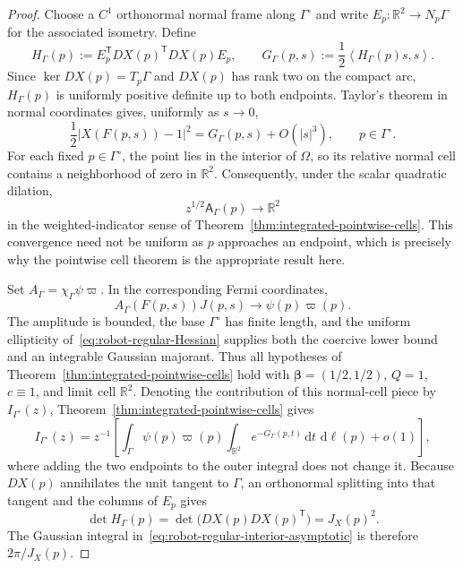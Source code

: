 \documentclass[10pt,a4paper]{amsart}
\newcommand{\Afib}{\mathsf{A}}
\newcommand{\R}{\mathbb{R}}
\newcommand{\dd}{\,\mathrm{d}}
\newcommand{\inner}[2]{\left\langle #1,#2\right\rangle}
\begin{document}
\begin{proof}
Choose a $C^1$ orthonormal normal frame along $\Gamma^\circ$ and write
$E_p:\R^2\to N_p\Gamma$ for the associated isometry.  Define
\begin{equation}\label{eq:robot-regular-Hessian}
 H_\Gamma(p):=E_p^{\mathsf T}DX(p)^{\mathsf T}DX(p)E_p,
 \qquad
 G_\Gamma(p,s):=\frac12\inner{H_\Gamma(p)s}{s}.
\end{equation}
Since $\ker DX(p)=T_p\Gamma$ and $DX(p)$ has rank two on the compact arc,
$H_\Gamma(p)$ is uniformly positive definite up to both endpoints.  Taylor's
theorem in normal coordinates gives, uniformly as $s\to0$,
\begin{equation}\label{eq:robot-regular-normal-model}
 \frac12|X(F(p,s))-1|^2
 =G_\Gamma(p,s)+O(|s|^3),
 \qquad p\in\Gamma^\circ.
\end{equation}
For each fixed $p\in\Gamma^\circ$, the point lies in the interior of $\Omega$,
so its relative normal cell contains a neighborhood of zero in $\R^2$.
Consequently, under the scalar quadratic dilation,
\[
 z^{1/2}\Afib_\Gamma(p)\longrightarrow\R^2
\]
in the weighted-indicator sense of
Theorem~\ref{thm:integrated-pointwise-cells}.  This convergence need not be
uniform as $p$ approaches an endpoint, which is precisely why the pointwise
cell theorem is the appropriate result here.

Set $A_\Gamma=\chi_\Gamma\psi\varpi$.  In the corresponding Fermi
coordinates,
\[
 A_\Gamma(F(p,s))J(p,s)\longrightarrow\psi(p)\varpi(p).
\]
The amplitude is bounded, the base $\Gamma^\circ$ has finite length, and the
uniform ellipticity of~\eqref{eq:robot-regular-Hessian} supplies both the
coercive lower bound and an integrable Gaussian majorant.  Thus all hypotheses
of Theorem~\ref{thm:integrated-pointwise-cells} hold with
$\bm\beta=(1/2,1/2)$, $Q=1$, $c\equiv1$, and limit cell $\R^2$.  Denoting the
contribution of this normal-cell piece by $I_{\Gamma^\circ}(z)$,
Theorem~\ref{thm:integrated-pointwise-cells} gives
\begin{equation}\label{eq:robot-regular-interior-asymptotic}
 I_{\Gamma^\circ}(z)
 =z^{-1}\left[
 \int_{\Gamma}
 \psi(p)\varpi(p)
 \int_{\R^2}e^{-G_\Gamma(p,t)}\dd t\,\dd\ell(p)
 +o(1)\right],
\end{equation}
where adding the two endpoints to the outer integral does not change it.
Because $DX(p)$ annihilates the unit tangent to $\Gamma$, an orthonormal
splitting into that tangent and the columns of $E_p$ gives
\[
 \det H_\Gamma(p)
 =\det\bigl(DX(p)DX(p)^{\mathsf T}\bigr)
 =J_X(p)^2.
\]
The Gaussian integral in~\eqref{eq:robot-regular-interior-asymptotic} is
therefore $2\pi/J_X(p)$.


\end{proof}
\end{document}
